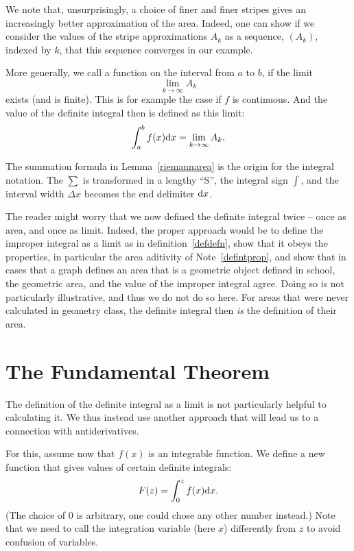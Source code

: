 We note that, unsurprisingly, a choice of finer and finer stripes gives an
increasingly better approximation of the area. Indeed, one can show if we
consider the values of the stripe approximations $A_k$ as a sequence,
$(A_k)$, indexed by $k$, that this sequence converges in our example.

\begin{defn}
\label{defdefn}
More generally, we call a function  on the interval from
$a$ to $b$, if the limit
\[
\lim_{k\to\infty} A_k
\]
exists (and is finite). This is for example the case if $f$ is continuous.
And the value of the definite integral then is defined as this limit:
\[
\int_a^b f(x){\mbox{d}}x=\lim_{k\to\infty} A_k.
\]
\end{defn}
\begin{note}
The summation formula in Lemma~\ref{riemannarea} is the origin for the integral
notation. The $\sum$ is transformed in a lengthy ``S'', the integral sign
$\int$, and the interval width $\Delta x$ becomes the end delimiter
${\mbox{d}}x$.
\end{note}

\begin{note}
The reader might worry that we now defined the definite integral twice -- once as
area, and once as limit. Indeed, the proper approach would be to define the
improper integral as a limit as in definition~\ref{defdefn}, show that it obeys
the properties, in particular the area aditivity of Note~\ref{defintprop}, and
show that in cases that a graph defines an area that is a geometric object defined
in school, the geometric area, and the value of the improper integral agree. Doing
so is not particularly illustrative, and thus we do not do so here.
For areas that were never calculated in geometry class, the definite integral then
{\em is} the definition of their area.
\end{note}

\section{The Fundamental Theorem}

The definition of the definite integral as a limit is not particularly helpful to
calculating it. We thus instead use another approach that will lead us to a
connection with antiderivatives.

For this, assume now that $f(x)$ is an integrable function.
We define a new function that gives values of certain definite integrals:
\[
F(z)=\int_0^z f(x){\mbox{d}}x.
\]
(The choice of $0$ is arbitrary, one could chose any other number instead.)
Note that we need to call the integration variable (here $x$) differently from $z$
to avoid confusion of variables.

